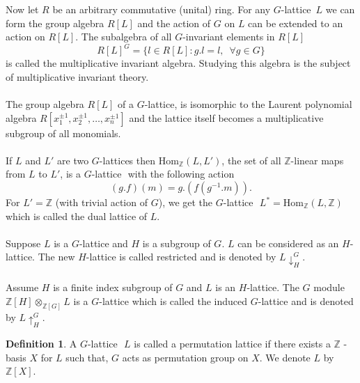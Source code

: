 \documentclass{article}
\theoremstyle{plain}
\newtheorem{lemma}[theorem]{Lemma}
\theoremstyle{definition}
\newtheorem{definition}[theorem]{Definition}
\newtheorem{example}[theorem]{Example}
\newcommand{\Z}{\ensuremath{\mathbb{Z}}}
\newcommand{\G}{G}
\newcommand{\glat}{$G$-lattice}
\begin{document}
Now let $R$ be an arbitrary commutative (unital) ring. For any \glat  \, $L$ we can form the group algebra $R[L]$ and the action of $G$ on $L$ can be extended to an action on $R[L]$. The subalgebra of all $G$-invariant elements in $R[L]$ $$ R[L]^ \G = \lbrace l \in R[L] : g.l = l, \,\,\, \forall g \in \G \rbrace$$ is called the multiplicative invariant algebra. Studying this algebra is the subject of multiplicative invariant theory. 
\\
\\
The group algebra $R[L]$ of a \glat , is isomorphic to the Laurent polynomial algebra \linebreak $R[x_1^{\pm 1}, x_2^{\pm 1}, \ldots , x_n^{\pm 1}] $ and the lattice itself becomes a multiplicative subgroup of all monomials.
\\
\\
If $L$ and $L'$ are two \glat  s then $\mathrm{Hom}_{\Z}(L,L')$, the set of all $\Z$-linear maps from $L$ to $L'$, is a \glat \,\, with the following action $$ (g.f)(m) = g.(f(g^{-1}.m)).$$
For $L'=\Z$ (with trivial action of $G$), we get the \glat \,\,  $L^* = \mathrm{Hom}_{\Z}(L,\Z)$ which is called the dual lattice of $L$.\\
\\Suppose $L$ is a $G$-lattice and $H$ is a subgroup of $G$. $L$ can be considered as an $H$-lattice. The new $H$-lattice is called restricted and is denoted by $L\downarrow^G_H$.\\
\\Assume $H$ is a finite index subgroup of $G$ and $L$ is an $H$-lattice. The $G$ module $\Z[H] \otimes_{\Z[G]} L$ is a $G$-lattice which is called the induced $G$-lattice and is denoted by $L\uparrow_H^G$. 
\begin{definition}
A \glat \,\, $L$ is called a permutation lattice if there exists a $\Z$ -basis $X$ for $L$ such that, $G$ acts as permutation group on $X$. We denote $L$ by $\Z[X]$.
\end{definition}
\end{document}
